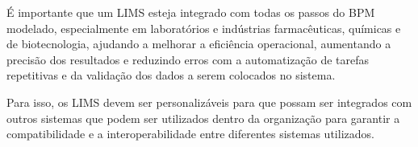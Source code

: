 É importante que um LIMS esteja integrado com todas os passos do BPM modelado, especialmente em laboratórios e indústrias farmacêuticas, químicas e de biotecnologia, ajudando a melhorar a eficiência operacional, aumentando a precisão dos resultados e reduzindo erros com a automatização de tarefas repetitivas e da validação dos dados a serem colocados no sistema.


Para isso, os LIMS devem ser personalizáveis para que possam ser integrados com outros sistemas que podem ser utilizados dentro da organização para garantir a compatibilidade e a interoperabilidade entre diferentes sistemas utilizados.